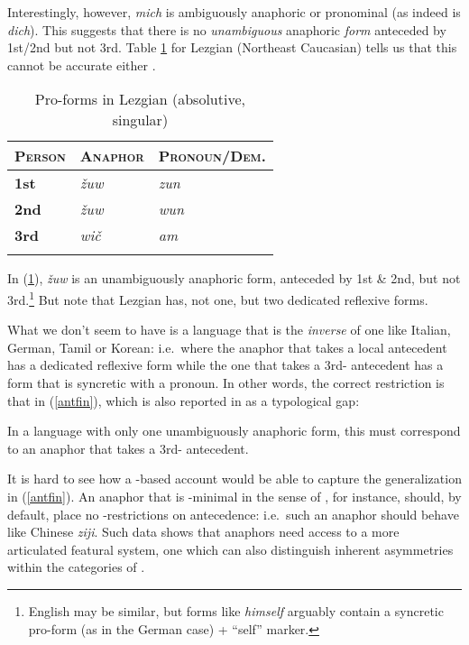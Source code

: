\documentclass[output=paper, modfonts, nonflat]{langsci/langscibook}
\begin{document}
\noindent Interestingly, however, \textit{mich} is ambiguously anaphoric or
pronominal (as indeed is \textit{dich}).  This suggests that there is
no \emph{unambiguous} anaphoric \emph{form} anteceded by 1st/2nd but
not 3rd. Table \ref{lez} for Lezgian (Northeast Caucasian) tells us
that this cannot be accurate either \citep[][184]{haspelmath:1993}.
\begin{table}[h]
	\centering
	\caption{Pro-forms in Lezgian (absolutive, singular)}  
	\label{lez}
	\begin{tabularx}{\textwidth}{XXX} 
		\lsptoprule
		\textsc{Person} & \textsc{Anaphor} & \textsc{Pronoun/Dem.}\\
		\midrule
		\textbf{1st} & \textit{\v{z}uw} & \textit{zun}\\
		\textbf{2nd} & \textit{\v{z}uw} & \textit{wun}\\
		\textbf{3rd} & \textit{wi\v{c}} & \textit{am}\\
		\lspbottomrule
	\end{tabularx}
\end{table}
\newline\noindent In (\ref{lez}), \textit{\v{z}uw} is an unambiguously anaphoric form,
anteceded by 1st \& 2nd, but not 3rd.\footnote{English may be similar,
  but forms like \textit{himself} arguably contain a syncretic
  pro-form (as in the German case) + ``self'' marker.}
But note that Lezgian has, not one, but two dedicated reflexive forms.

What we don't seem to have is a language that is the \emph{inverse} of
one like Italian, German, Tamil or Korean: i.e.\ where the anaphor
that takes a local antecedent has a dedicated reflexive form while the
one that takes a 3rd-\person{} antecedent has a form that is syncretic
with a pronoun. In other words, the correct restriction is that in
(\ref{antfin}), which is also reported in \citet{comrie:1999} as a
typological gap:

\ea\label{antfin} In a language with only one unambiguously anaphoric
  form, this must correspond to an anaphor that takes a 3rd-\person{}
  antecedent.
\z

\noindent It is hard to see how a \ph-based account would be able to capture the
generalization in (\ref{antfin}). An anaphor that is \ph-minimal in
the sense of \citet{kratzer:2009}, for instance, should, by default,
place no \person-restrictions on antecedence: i.e.\ such an anaphor
should behave like Chinese \textit{ziji}. Such data shows that
anaphors need access to a more articulated featural system, one which
can also distinguish inherent asymmetries within the categories of
\person.
\end{document}
